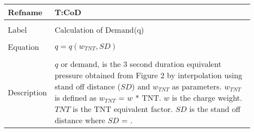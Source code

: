 \documentclass[12pt]{article}
\begin{document}
\noindent \begin{minipage}{\textwidth}
\begin{tabular}{p{} p{}}
\toprule \textbf{Refname} & \textbf{T:CoD}
\label{T:CoD}
\\ \midrule \\
Label & Calculation of Demand(q)
\\ \midrule \\
Equation & $q=q(w_{TNT},SD)$
\\ \midrule \\
Description & $q$ or demand, is the 3 second duration equivalent pressure obtained from Figure 2 by interpolation using stand off distance ($SD$) and $w_{TNT}$ as parameters. $w_{TNT}$ is defined as $w_{TNT}$ = $w$ * TNT. $w$ is the charge weight. $TNT$ is the TNT equivalent factor. $SD$ is the stand off distance where $SD$ = .
\\ \bottomrule \end{tabular}
\end{minipage}\\
\end{document}
